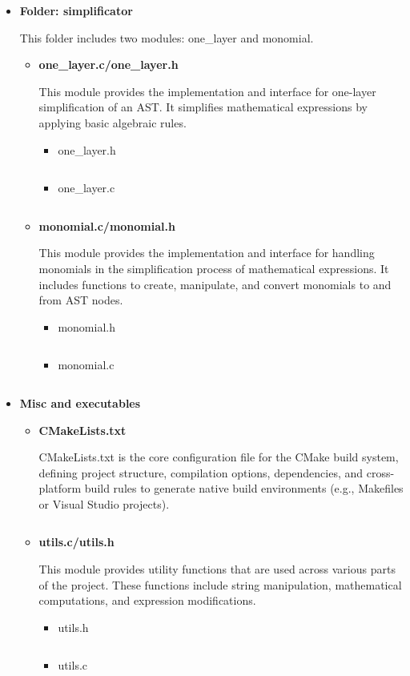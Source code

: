 \documentclass{report}
\begin{document}
\begin{itemize}
    \item \textbf{Folder: simplificator}
    
    This folder includes two modules: one\_layer and monomial.
    \begin{itemize}
        \item \textbf{one\_layer.c/one\_layer.h}
        
        This module provides the implementation and interface for one-layer simplification of an AST. It simplifies mathematical expressions by applying basic algebraic rules.
        \begin{itemize}
            \item one\_layer.h
            \inputminted{c}{../code/simplificator/one_layer.h}
            \item one\_layer.c
            \inputminted{c}{../code/simplificator/one_layer.c}
        \end{itemize}

        \item \textbf{monomial.c/monomial.h}
        
        This module provides the implementation and interface for handling monomials in the simplification process of mathematical expressions. It includes functions to create, manipulate, and convert monomials to and from AST nodes.
        \begin{itemize}
            \item monomial.h
            \inputminted{c}{../code/simplificator/monomial.h}
            \item monomial.c
            \inputminted{c}{../code/simplificator/monomial.c}
        \end{itemize}
    \end{itemize}

    \item \textbf{Misc and executables}
    \begin{itemize}
        \item \textbf{CMakeLists.txt}

        CMakeLists.txt is the core configuration file for the CMake build system, defining project structure, compilation options, dependencies, and cross-platform build rules to generate native build environments (e.g., Makefiles or Visual Studio projects).
        \inputminted{cmake}{../code/CMakeLists.txt}

        \item \textbf{utils.c/utils.h}
        
        This module provides utility functions that are used across various parts of the project. These functions include string manipulation, mathematical computations, and expression modifications.
        \begin{itemize}
            \item utils.h
            \inputminted{c}{../code/utils.h}
            \item utils.c
            \inputminted{c}{../code/utils.c}
        \end{itemize}


\end{itemize}
\end{itemize}
\end{document}
